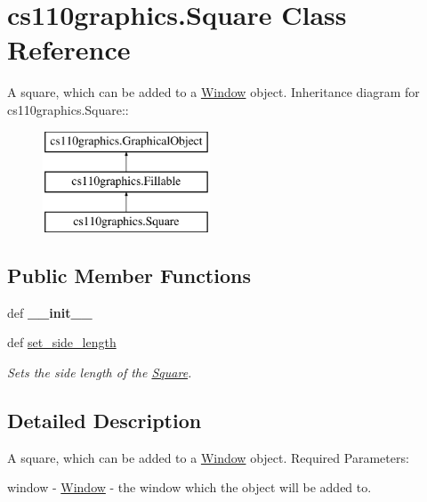 \hypertarget{classcs110graphics_1_1Square}{
\section{cs110graphics.Square Class Reference}
\label{classcs110graphics_1_1Square}
}


A square, which can be added to a \hyperlink{classcs110graphics_1_1Window}{Window} object.  
Inheritance diagram for cs110graphics.Square::\begin{figure}[H]
\begin{center}
\leavevmode
\includegraphics[height=3cm]{classcs110graphics_1_1Square}
\end{center}
\end{figure}
\subsection*{Public Member Functions}
\begin{DoxyCompactItemize}
\item 
\hypertarget{classcs110graphics_1_1Square_ae4b847029070a73478fd7dd2eefeb58e}{
def {\bfseries \_\-\_\-init\_\-\_\-}}
\label{classcs110graphics_1_1Square_ae4b847029070a73478fd7dd2eefeb58e}

\item 
def \hyperlink{classcs110graphics_1_1Square_a4b650f9ef28d4fab88d36ce65e8e0cf1}{set\_\-side\_\-length}
\begin{DoxyCompactList}\small\item\em Sets the side length of the \hyperlink{classcs110graphics_1_1Square}{Square}. \item\end{DoxyCompactList}\end{DoxyCompactItemize}


\subsection{Detailed Description}
A square, which can be added to a \hyperlink{classcs110graphics_1_1Window}{Window} object. Required Parameters:
\begin{DoxyItemize}
\item window -\/ \hyperlink{classcs110graphics_1_1Window}{Window} -\/ the window which the object will be added to.
\end{DoxyItemize}


